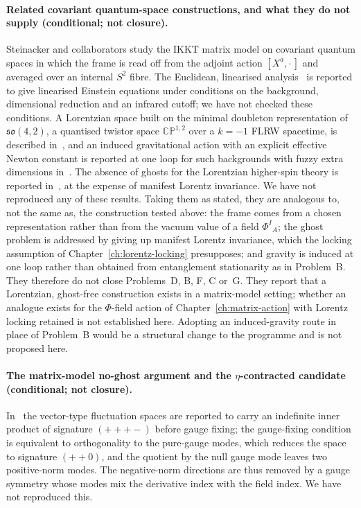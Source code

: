 \paragraph{Related covariant quantum-space constructions, and what they do
not supply (conditional; not closure).}
Steinacker and collaborators study the IKKT matrix model on covariant
quantum spaces in which the frame is read off from the adjoint action
\([X^a,\cdot\,]\) and averaged over an internal \(S^2\) fibre.  The Euclidean,
linearised analysis~\cite{Steinacker2016Gravity} is reported to give
linearised Einstein equations under conditions on the background, dimensional
reduction and an infrared cutoff; we have not checked these conditions.  A
Lorentzian space built on the minimal doubleton representation of
\(\mathfrak{so}(4,2)\), a quantised twistor space \(\mathbb{CP}^{1,2}\) over a
\(k=-1\) FLRW spacetime, is described in~\cite{MantaSteinacker2025}, and an
induced gravitational action with an explicit effective Newton constant is
reported at one loop for such backgrounds with fuzzy extra dimensions
in~\cite{MantaSteinackerTran2024}.  The absence of ghosts for the Lorentzian
higher-spin theory is reported in~\cite{Steinacker2019NoGhost}, at the expense
of manifest Lorentz invariance.  We have not reproduced any of these results.
Taking them as stated, they are analogous to, not the same as, the
construction tested above: the frame comes from a chosen representation
rather than from the vacuum value of a field \(\Phi^I{}_A\); the ghost problem
is addressed by giving up manifest Lorentz invariance, which the locking
assumption of Chapter~\ref{ch:lorentz-locking} presupposes; and gravity is
induced at one loop rather than obtained from entanglement stationarity as in
Problem~B.  They therefore do not close Problems~D, B, F, C or~G.  They report
that a Lorentzian, ghost-free construction exists in a matrix-model setting;
whether an analogue exists for the \(\Phi\)-field action of
Chapter~\ref{ch:matrix-action} with Lorentz locking retained is not
established here.  Adopting an induced-gravity route in place of Problem~B
would be a structural change to the programme and is not proposed here.

\paragraph{The matrix-model no-ghost argument and the \(\eta\)-contracted
candidate (conditional; not closure).}
In~\cite{Steinacker2019NoGhost} the vector-type fluctuation spaces are
reported to carry an indefinite inner product of signature \((+++-)\) before
gauge fixing; the gauge-fixing condition is equivalent to orthogonality to
the pure-gauge modes, which reduces the space to signature \((++0)\), and the
quotient by the null gauge mode leaves two positive-norm modes.  The
negative-norm directions are thus removed by a gauge symmetry whose modes mix
the derivative index with the field index.  We have not reproduced this.

